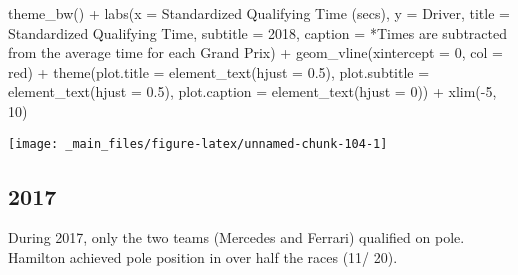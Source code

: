 \documentclass[
]{book}
\newenvironment{Shaded}{\begin{snugshade}}{\end{snugshade}}
\newcommand{\AttributeTok}[1]{\textcolor[rgb]{0.77,0.63,0.00}{#1}}
\newcommand{\DecValTok}[1]{\textcolor[rgb]{0.00,0.00,0.81}{#1}}
\newcommand{\FloatTok}[1]{\textcolor[rgb]{0.00,0.00,0.81}{#1}}
\newcommand{\FunctionTok}[1]{\textcolor[rgb]{0.00,0.00,0.00}{#1}}
\newcommand{\NormalTok}[1]{#1}
\newcommand{\SpecialCharTok}[1]{\textcolor[rgb]{0.00,0.00,0.00}{#1}}
\newcommand{\StringTok}[1]{\textcolor[rgb]{0.31,0.60,0.02}{#1}}
\begin{document}
\begin{Shaded}
\begin{Highlighting}[]
  \FunctionTok{theme\_bw}\NormalTok{() }\SpecialCharTok{+}
  \FunctionTok{labs}\NormalTok{(}\AttributeTok{x =} \StringTok{\textquotesingle{}Standardized Qualifying Time (secs)\textquotesingle{}}\NormalTok{,}
       \AttributeTok{y =} \StringTok{\textquotesingle{}Driver\textquotesingle{}}\NormalTok{,}
       \AttributeTok{title =} \StringTok{\textquotesingle{}Standardized Qualifying Time\textquotesingle{}}\NormalTok{,}
       \AttributeTok{subtitle =} \StringTok{\textquotesingle{}2018\textquotesingle{}}\NormalTok{,}
       \AttributeTok{caption =} \StringTok{\textquotesingle{}*Times are subtracted from the average time for each Grand Prix\textquotesingle{}}\NormalTok{) }\SpecialCharTok{+}
  \FunctionTok{geom\_vline}\NormalTok{(}\AttributeTok{xintercept =} \DecValTok{0}\NormalTok{, }\AttributeTok{col =} \StringTok{\textquotesingle{}red\textquotesingle{}}\NormalTok{) }\SpecialCharTok{+}
  \FunctionTok{theme}\NormalTok{(}\AttributeTok{plot.title =} \FunctionTok{element\_text}\NormalTok{(}\AttributeTok{hjust =} \FloatTok{0.5}\NormalTok{),}
        \AttributeTok{plot.subtitle =} \FunctionTok{element\_text}\NormalTok{(}\AttributeTok{hjust =} \FloatTok{0.5}\NormalTok{),}
        \AttributeTok{plot.caption =} \FunctionTok{element\_text}\NormalTok{(}\AttributeTok{hjust =} \DecValTok{0}\NormalTok{)) }\SpecialCharTok{+}
  \FunctionTok{xlim}\NormalTok{(}\SpecialCharTok{{-}}\DecValTok{5}\NormalTok{, }\DecValTok{10}\NormalTok{)}
\end{Highlighting}
\end{Shaded}

\begin{center}\texttt{[image: \_main\_files/figure-latex/unnamed-chunk-104-1]} \end{center}

\hypertarget{section-6}{%
\subsection{2017}\label{section-6}}

During 2017, only the two teams (Mercedes and Ferrari) qualified on pole. Hamilton achieved pole position in over half the races (11/ 20).
\end{document}
